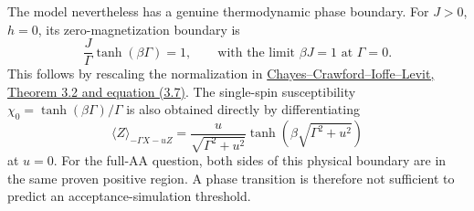 The model nevertheless has a genuine thermodynamic phase boundary.
For \(J>0\), \(h=0\), its zero-magnetization boundary is
\[
 \frac{J}{\Gamma}\tanh(\beta\Gamma)=1,
 \qquad\text{with the limit }\beta J=1\text{ at }\Gamma=0.
\]
This follows by rescaling the normalization in
\href{https://arxiv.org/abs/0804.1605}{Chayes--Crawford--Ioffe--Levit,
Theorem 3.2 and equation (3.7)}. The single-spin susceptibility
\(\chi_0=\tanh(\beta\Gamma)/\Gamma\) is also obtained directly by
differentiating
\[
 \langle Z\rangle_{-\Gamma X-uZ}
 =\frac{u}{\sqrt{\Gamma^2+u^2}}
   \tanh\!\left(\beta\sqrt{\Gamma^2+u^2}\right)
\]
at \(u=0\). For the full-AA question, both sides of this physical
boundary are in the same proven positive region. A phase transition is
therefore not sufficient to predict an acceptance-simulation threshold.
